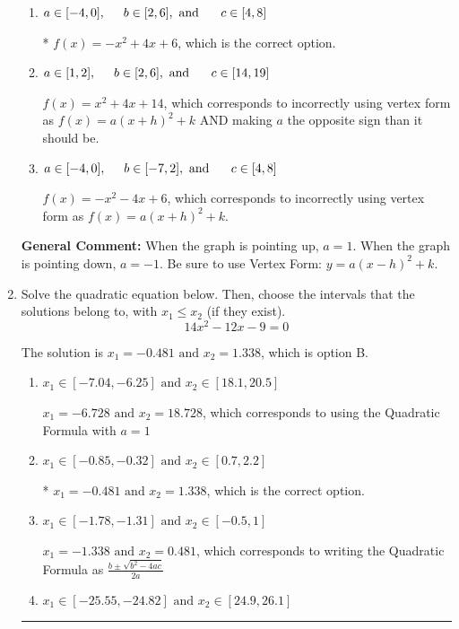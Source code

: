 \documentclass{extbook}[14pt]
\newcommand{\litem}[1]{\item #1

\rule{\textwidth}{0.4pt}}
\begin{document}
\begin{enumerate}
{\begin{enumerate}[label=\Alph*.]
$f(x)=x^{2} -4 x + 14$, which corresponds to making $a$ the opposite sign than it should be.
\item \( a \in [-4, 0], \hspace*{5mm} b \in [2, 6], \text{ and } \hspace*{5mm} c \in [4, 8] \)

* $f(x)=-x^{2} +4 x + 6$, which is the correct option.
\item \( a \in [1, 2], \hspace*{5mm} b \in [2, 6], \text{ and } \hspace*{5mm} c \in [14, 19] \)

$f(x)=x^{2} +4 x + 14$, which corresponds to incorrectly using vertex form as $f(x) = a(x+h)^2+k$ AND making $a$ the opposite sign than it should be.
\item \( a \in [-4, 0], \hspace*{5mm} b \in [-7, 2], \text{ and } \hspace*{5mm} c \in [4, 8] \)

$f(x)=-x^{2} -4 x + 6$, which corresponds to incorrectly using vertex form as $f(x) = a(x+h)^2+k$.
\end{enumerate}

\textbf{General Comment:} When the graph is pointing up, $a=1$. When the graph is pointing down, $a=-1$. Be sure to use Vertex Form: $y = a(x-h)^2+k$.
}
\litem{
Solve the quadratic equation below. Then, choose the intervals that the solutions belong to, with $x_1 \leq x_2$ (if they exist).
\[ 14x^{2} -12 x -9 = 0 \]

The solution is \( x_1 = -0.481 \text{ and } x_2 = 1.338 \), which is option B.\begin{enumerate}[label=\Alph*.]
\item \( x_1 \in [-7.04, -6.25] \text{ and } x_2 \in [18.1, 20.5] \)

 $x_1 = -6.728 \text{ and } x_2 = 18.728$, which corresponds to using the Quadratic Formula with $a=1$
\item \( x_1 \in [-0.85, -0.32] \text{ and } x_2 \in [0.7, 2.2] \)

* $x_1 = -0.481 \text{ and } x_2 = 1.338$, which is the correct option.
\item \( x_1 \in [-1.78, -1.31] \text{ and } x_2 \in [-0.5, 1] \)

 $x_1 = -1.338 \text{ and } x_2 = 0.481$, which corresponds to writing the Quadratic Formula as $\frac{b \pm \sqrt{b^2 - 4ac}}{2a}$
\item \( x_1 \in [-25.55, -24.82] \text{ and } x_2 \in [24.9, 26.1] \)


\end{enumerate}}
\end{enumerate}
\end{document}
